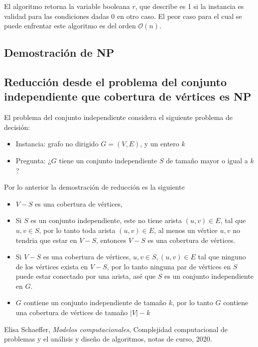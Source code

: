 \documentclass[letterpaper,11pt]{article}
\begin{document}
El algoritmo retorna la variable booleana $r$, que describe es 1 si la instancia es validad para las condiciones dadas 0 en otro caso. El peor caso para el cual se puede enfrentar este algoritmo es del orden $\mathcal{O}(n)$.

\subsection{Demostración de NP}

\subsection{Reducción desde el problema del conjunto independiente que cobertura de vértices es NP}

El problema del conjunto independiente considera el siguiente problema de decisión:
\begin{itemize}
\item Instancia: grafo no dirigido $G=(V,E)$, y un entero $k$
\item Pregunta: ¿$G$ tiene un conjunto independiente $S$ de tamaño mayor o igual a $k$? 
\end{itemize}

Por lo anterior la demostración de reducción es la siguiente

\begin{itemize}
\item $V-S$ es una cobertura de vértices,
\item Si $S$ es un conjunto independiente, este no tiene arista $(u,v)\in E$, tal que $u,v \in S$, por lo tanto toda arista $(u,v)\in E$, al menos un vértice 	$u,v$ no tendria que estar en $V-S$, entonces $V-S$ es una cobertura de vértices.
\item Si $V-S$ es una cobertura de vértices, $u,v\in S, (u,v) \in E$ tal que ninguno de los vértices exista en $V-S$, por lo tanto ninguna par de vértices en $S$ puede estar conectado por una arista, asé que $S$ es un conjunto independiente en $G$.
\item $G$ contiene un conjunto independiente de tamaño $k$, por lo tanto $G$ contiene una cobertura de vértices de tamaño $|V|-k$
 

\end{itemize}


\begin{thebibliography}{0}
   Elisa Schaeffer, \textit{Modelos computacionales}, Complejidad computacional de problemas y el análisis y diseño de algoritmos, notas de curso, 2020.
\end{thebibliography}
\end{document}
